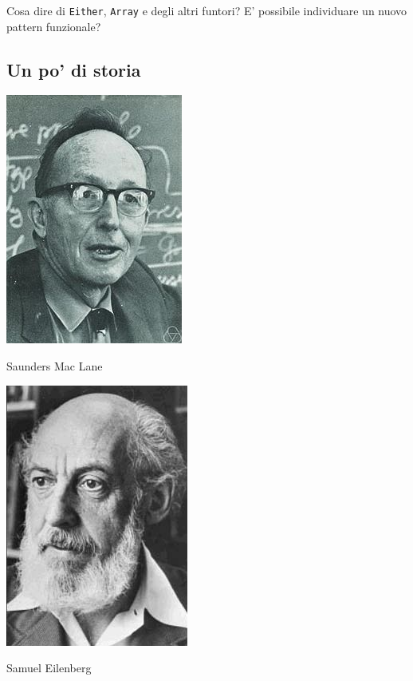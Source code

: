\documentclass[12pt]{article}
\begin{document}
Cosa dire di \texttt{Either}, \texttt{Array} e degli altri funtori?
E' possibile individuare un nuovo pattern funzionale?

\subsection{Un po' di storia}

\begin{center}
\includegraphics[scale=0.6]{maclane}

Saunders Mac Lane
\end{center}

\begin{center}
\includegraphics[scale=0.6]{eilenberg}

Samuel Eilenberg
\end{center}
\end{document}
